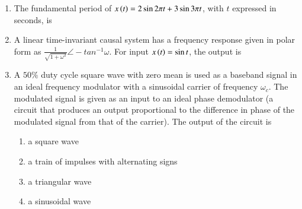 \documentclass[journal,12pt,onecolumn]{IEEEtran}
\theoremstyle{remark}
\begin{document}
\begin{enumerate}
 
\item The fundamental period of $x\left(t\right)=2\sin{2{\pi}t} + 3\sin3{\pi}t$, with $t$ expressed in seconds, is\par \hfill{}
\begin{enumerate}
\end{enumerate}

 
\item A linear time-invariant causal system has a frequency response given in polar form as $\frac{1}{\sqrt{1+{\omega}^2}}$$\angle-tan^{-1}\omega$. For input $x\left(t\right)=\sin{t}$, the output is  \par \hfill{}
\begin{enumerate}
\end{enumerate}

 
\item A $50\%$ duty cycle square wave with zero mean is used as a baseband signal in an ideal frequency modulator with a sinusoidal carrier of frequency $\omega_c$. The modulated signal is given as an input to an ideal phase demodulator (a circuit that produces an output proportional to the difference in phase of the modulated signal from that of the carrier). The output of the circuit is\par \hfill{}
    \begin{enumerate}
        \item a square wave
        \item a train of impulses with alternating signs
        \item a triangular wave
        \item a sinusoidal wave
\end{enumerate}
 


\end{enumerate}
\end{document}
